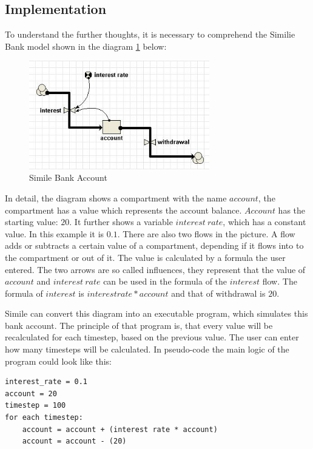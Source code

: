 \subsection{Implementation}
\par
To understand the further thoughts, it is necessary to comprehend the Similie Bank model shown in the diagram \ref{fig:simile_bank_account} below:
\begin{figure}[h]
	\centering
	\includegraphics[width=0.7\textwidth]{pics/generation_of_a_dsl/similie_bank_account.png}
	\caption{Simile Bank Account \label{fig:simile_bank_account}}	
\end{figure}
\par
In detail, the diagram shows a compartment with the name $account$, the compartment has a value which represents the account balance. $Account$ has the starting value: $20$. It further shows a variable $interest\:rate$, which has a constant value. In this example it is $0.1$. There are also two flows in the picture. A flow adds or subtracts a certain value of a compartment, depending if it flows into to the compartment or out of it. The value is calculated by a formula the user entered. The two arrows are so called influences, they represent that the value of $account$ and $interest\:rate$ can be used in the formula of the $interest$ flow. The formula of $interest$ is $interest rate * account$ and that of withdrawal is $20$.
\par
Simile can convert this diagram into an executable program, which simulates this bank account. The principle of that program is, that every value will be recalculated for each timestep, based on the previous value. The user can enter how many timesteps will be calculated. In pseudo-code the main logic of the program could look like this:
\begin{lstlisting}
interest_rate = 0.1
account = 20
timestep = 100
for each timestep:
	account = account + (interest rate * account)
	account = account - (20)
\end{lstlisting}
